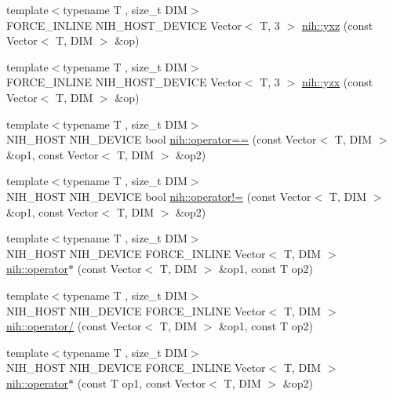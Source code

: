 \begin{DoxyCompactItemize}
{\footnotesize template$<$typename T , size\-\_\-t \-D\-I\-M$>$ }\\\-F\-O\-R\-C\-E\-\_\-\-I\-N\-L\-I\-N\-E \-N\-I\-H\-\_\-\-H\-O\-S\-T\-\_\-\-D\-E\-V\-I\-C\-E \*
\-Vector$<$ \-T, 3 $>$ \hyperlink{group__linalg_gaacc6c8319788b93e1cf61288299530ca}{nih\-::yxz} (const \-Vector$<$ \-T, \-D\-I\-M $>$ \&op)
\item 
{\footnotesize template$<$typename T , size\-\_\-t \-D\-I\-M$>$ }\\\-F\-O\-R\-C\-E\-\_\-\-I\-N\-L\-I\-N\-E \-N\-I\-H\-\_\-\-H\-O\-S\-T\-\_\-\-D\-E\-V\-I\-C\-E \*
\-Vector$<$ \-T, 3 $>$ \hyperlink{group__linalg_ga5bae4031dc463ce54993a932a5671a17}{nih\-::yzx} (const \-Vector$<$ \-T, \-D\-I\-M $>$ \&op)
\item 
{\footnotesize template$<$typename T , size\-\_\-t \-D\-I\-M$>$ }\\\-N\-I\-H\-\_\-\-H\-O\-S\-T \-N\-I\-H\-\_\-\-D\-E\-V\-I\-C\-E bool \hyperlink{group__linalg_gaabd17838f41c1637cb84a3cfe31dfb0b}{nih\-::operator==} (const \-Vector$<$ \-T, \-D\-I\-M $>$ \&op1, const \-Vector$<$ \-T, \-D\-I\-M $>$ \&op2)
\item 
{\footnotesize template$<$typename T , size\-\_\-t \-D\-I\-M$>$ }\\\-N\-I\-H\-\_\-\-H\-O\-S\-T \-N\-I\-H\-\_\-\-D\-E\-V\-I\-C\-E bool \hyperlink{group__linalg_ga884852dfe6e126e524af6c966fd3fa8e}{nih\-::operator!=} (const \-Vector$<$ \-T, \-D\-I\-M $>$ \&op1, const \-Vector$<$ \-T, \-D\-I\-M $>$ \&op2)
\item 
{\footnotesize template$<$typename T , size\-\_\-t \-D\-I\-M$>$ }\\\-N\-I\-H\-\_\-\-H\-O\-S\-T \-N\-I\-H\-\_\-\-D\-E\-V\-I\-C\-E \*
\-F\-O\-R\-C\-E\-\_\-\-I\-N\-L\-I\-N\-E \-Vector$<$ \-T, \-D\-I\-M $>$ \hyperlink{group__linalg_ga400f2fbe2094965df70010d98a05e1fc}{nih\-::operator$\ast$} (const \-Vector$<$ \-T, \-D\-I\-M $>$ \&op1, const \-T op2)
\item 
{\footnotesize template$<$typename T , size\-\_\-t \-D\-I\-M$>$ }\\\-N\-I\-H\-\_\-\-H\-O\-S\-T \-N\-I\-H\-\_\-\-D\-E\-V\-I\-C\-E \*
\-F\-O\-R\-C\-E\-\_\-\-I\-N\-L\-I\-N\-E \-Vector$<$ \-T, \-D\-I\-M $>$ \hyperlink{group__linalg_gafe00990ed787cec75b986c394b7f5e0f}{nih\-::operator/} (const \-Vector$<$ \-T, \-D\-I\-M $>$ \&op1, const \-T op2)
\item 
{\footnotesize template$<$typename T , size\-\_\-t \-D\-I\-M$>$ }\\\-N\-I\-H\-\_\-\-H\-O\-S\-T \-N\-I\-H\-\_\-\-D\-E\-V\-I\-C\-E \*
\-F\-O\-R\-C\-E\-\_\-\-I\-N\-L\-I\-N\-E \-Vector$<$ \-T, \-D\-I\-M $>$ \hyperlink{group__linalg_gaea85e6f752c95162ffe3388dd87d57d4}{nih\-::operator$\ast$} (const \-T op1, const \-Vector$<$ \-T, \-D\-I\-M $>$ \&op2)

\end{DoxyCompactItemize}

